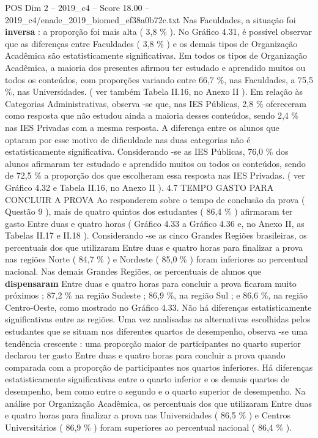 \begin{textsample}{POS Dim 2 – 2019\_c4 – Score 18.00 – 2019\_c4/enade\_2019\_biomed\_ef38a0b72c.txt}
Nas Faculdades, a situação foi \textbf{inversa} : a proporção foi mais alta ( 3,8 \% ).
No Gráfico 4.31, é possível observar que as diferenças entre Faculdades ( 3,8 \% ) e os demais tipos de Organização Acadêmica são estatisticamente significativas.
Em todos os tipos de Organização Acadêmica, a maioria dos presentes afirmou ter estudado e aprendido muitos ou todos os conteúdos, com proporções variando entre 66,7 \%, nas Faculdades, a 75,5 \%, nas Universidades. ( ver também Tabela II.16, no Anexo II ).
Em relação às Categorias Administrativas, observa -se que, nas IES Públicas, 2,8 \% ofereceram como resposta que não estudou ainda a maioria desses conteúdos, sendo 2,4 \% nas IES Privadas com a mesma resposta.
A diferença entre os alunos que optaram por esse motivo de dificuldade nas duas categorias não é estatisticamente significativa.
Considerando -se as IES Públicas, 76,0 \% dos alunos afirmaram ter estudado e aprendido muitos ou todos os conteúdos, sendo de 72,5 \% a proporção dos que escolheram essa resposta nas IES Privadas. ( ver Gráfico 4.32 e Tabela II.16, no Anexo II ). 4.7 TEMPO GASTO PARA CONCLUIR A PROVA Ao responderem sobre o tempo de conclusão da prova ( Questão 9 ), mais de quatro quintos dos estudantes ( 86,4 \% ) afirmaram ter gasto Entre duas e quatro horas ( Gráfico 4.33 a Gráfico 4.36 e, no Anexo II, as Tabelas II.17 e II.18 ).
Considerando -se as cinco Grandes Regiões brasileiras, os percentuais dos que utilizaram Entre duas e quatro horas para finalizar a prova nas regiões Norte ( 84,7 \% ) e Nordeste ( 85,0 \% ) foram inferiores ao percentual nacional.
Nas demais Grandes Regiões, os percentuais de alunos que \textbf{dispensaram} Entre duas e quatro horas para concluir a prova ficaram muito próximos ; 87,2 \% na região Sudeste ; 86,9 \%, na região Sul ; e 86,6 \%, na região Centro-Oeste, como mostrado no Gráfico 4.33.
Não há diferenças estatisticamente significativas entre as regiões.
Uma vez analisadas as alternativas escolhidas pelos estudantes que se situam nos diferentes quartos de desempenho, observa -se uma tendência crescente : uma proporção maior de participantes no quarto superior declarou ter gasto Entre duas e quatro horas para concluir a prova quando comparada com a proporção de participantes nos quartos inferiores.
Há diferenças estatisticamente significativas entre o quarto inferior e os demais quartos de desempenho, bem como entre o segundo e o quarto superior de desempenho.
Na análise por Organização Acadêmica, os percentuais dos que utilizaram Entre duas e quatro horas para finalizar a prova nas Universidades ( 86,5 \% ) e Centros Universitários ( 86,9 \% ) foram superiores ao percentual nacional ( 86,4 \% ).

\end{textsample}
